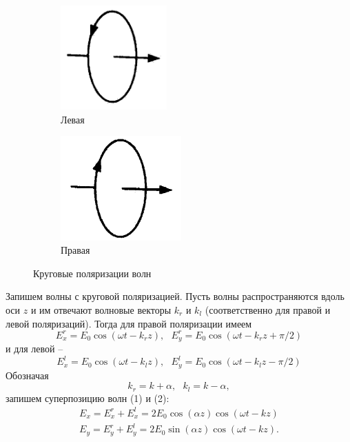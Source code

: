 \documentclass[14pt]{article}
\begin{document}
\begin{figure}[h!]

\begin{subfigure}{0.5\textwidth}
	\centering
	\includegraphics[height=4cm]{Left} 
	\caption{Левая}
\end{subfigure}
\begin{subfigure}{0.5\textwidth}
	\centering
	\includegraphics[height=4cm]{Right}
	\caption{Правая}
\end{subfigure}
	\caption{Круговые поляризации волн}
	
\end{figure}

Запишем волны с круговой поляризацией. Пусть волны распространяются вдоль оси $z$ и им отвечают волновые векторы $k_r$ и $k_l$ (соответственно для правой и левой поляризаций). Тогда для правой поляризации имеем
\begin{equation}
	E_x^r = E_0\cos(\omega t - k_rz),~~~E_y^r = E_0\cos(\omega t - k_rz + \pi/2)
\end{equation}
и для левой --
\begin{equation}
	E_x^l = E_0\cos(\omega t - k_lz),~~~E_y^l = E_0\cos(\omega t - k_lz - \pi/2)
\end{equation}
Обозначая
\begin{equation}
	k_r = k + \alpha,~~~k_l = k - \alpha,
\end{equation}
запишем суперпозицию волн (1) и (2):
\begin{equation}
\begin{aligned}
	E_x = E_x^r + E_x^l = 2E_0\cos(\alpha z)\cos(\omega t - kz)	\\
	E_y = E_y^r + E_y^l = 2E_0\sin(\alpha z)\cos(\omega t - kz).
\end{aligned}
\end{equation}
\end{document}
